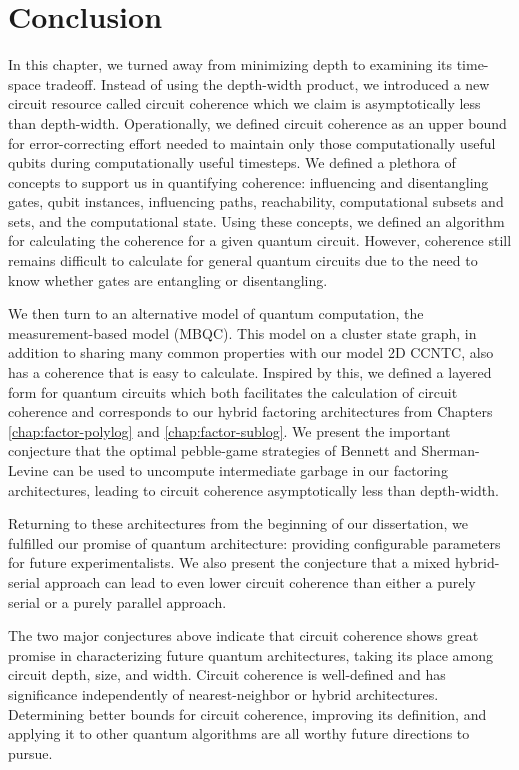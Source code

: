 \section{Conclusion}
\label{sec:coherence-conclude}

In this chapter, we turned away from minimizing depth to
examining its time-space tradeoff. Instead of using the
depth-width product, we introduced a new circuit resource
called circuit coherence
which we claim is asymptotically less than depth-width.
Operationally, we defined circuit coherence as an upper
bound for error-correcting effort needed to maintain
only those computationally useful qubits during
computationally useful timesteps. We defined a
plethora of concepts to support us in quantifying
coherence:
influencing and disentangling gates, qubit instances,
influencing paths, reachability, computational subsets
and sets, and the computational state.
Using these concepts, we defined an algorithm for
calculating the coherence for a given quantum circuit.
However, coherence still remains difficult to calculate
for general quantum circuits due to the need to know
whether gates are entangling or disentangling.

We then turn to an alternative model of quantum
computation, the measurement-based model (MBQC).
This model on a cluster state graph, in addition
to sharing many common properties with our
model \textsf{2D CCNTC}, also has a coherence that
is easy to calculate. Inspired by this, we defined
a layered form for quantum circuits which both
facilitates the calculation of circuit coherence
and corresponds to our hybrid factoring architectures
from Chapters \ref{chap:factor-polylog} and \ref{chap:factor-sublog}.
We present the important conjecture that
the optimal pebble-game strategies of Bennett and
Sherman-Levine can be used to uncompute intermediate
garbage in our factoring architectures, leading to
circuit coherence asymptotically less than
depth-width.

Returning to these architectures from the beginning
of our dissertation, we fulfilled our
promise of quantum architecture: providing configurable
parameters for future experimentalists.
We also present the conjecture that a mixed
hybrid-serial approach can lead to even
lower circuit coherence than either a purely
serial or a purely parallel approach.

The two major conjectures above indicate that
circuit coherence shows great promise in
characterizing future quantum architectures,
taking its place among circuit depth, size,
and width. Circuit coherence is well-defined
and has significance independently of
nearest-neighbor or hybrid architectures.
Determining better bounds for circuit coherence,
improving its definition, and applying it
to other quantum algorithms are all worthy
future directions to pursue.